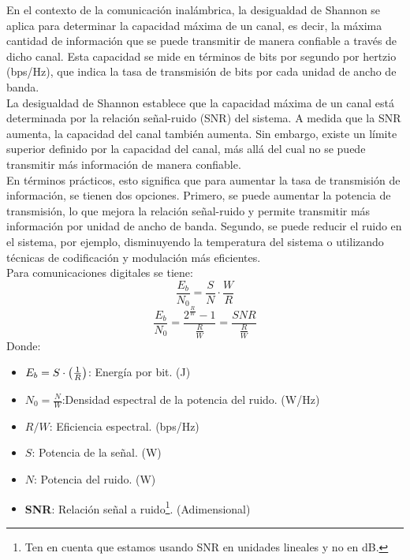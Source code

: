 \documentclass[
	12pt, %
	fleqn, %
	a4paper, %
	oneside, %
]{LegrandOrangeBook}
\begin{document}
En el contexto de la comunicación inalámbrica, la desigualdad de Shannon se aplica para determinar la capacidad máxima de un canal, es decir, la máxima cantidad de información que se puede transmitir de manera confiable a través de dicho canal. Esta capacidad se mide en términos de bits por segundo por hertzio (bps/Hz), que indica la tasa de transmisión de bits por cada unidad de ancho de banda.\\
La desigualdad de Shannon establece que la capacidad máxima de un canal está determinada por la relación señal-ruido (SNR) del sistema. A medida que la SNR aumenta, la capacidad del canal también aumenta. Sin embargo, existe un límite superior definido por la capacidad del canal, más allá del cual no se puede transmitir más información de manera confiable.\\
En términos prácticos, esto significa que para aumentar la tasa de transmisión de información, se tienen dos opciones. Primero, se puede aumentar la potencia de transmisión, lo que mejora la relación señal-ruido y permite transmitir más información por unidad de ancho de banda. Segundo, se puede reducir el ruido en el sistema, por ejemplo, disminuyendo la temperatura del sistema o utilizando técnicas de codificación y modulación más eficientes.\\
Para comunicaciones digitales se tiene:
\begin{equation}
\frac{E_b}{N_0}=\frac{S}{N}\cdot\frac{W}{R}
\end{equation}
\begin{equation}
\frac{E_b}{N_0}=\frac{2^{\frac{R}{W}}-1}{\frac{R}{W}}=\frac{SNR}{\frac{R}{W}}
\end{equation}
Donde:
\begin{itemize}
\item $E_b=S\cdot\left(\frac{1}{R}\right)$: Energía por bit. (J)
\item $N_0=\frac{N}{W}$:Densidad espectral de la potencia del ruido. (W/Hz)
\item $R/W$: Eficiencia espectral. (bps/Hz)
\item $S$: Potencia de la señal. (W)
\item $N$: Potencia del ruido. (W)
\item \textbf{SNR}: Relación señal a ruido\footnote{Ten en cuenta que estamos usando SNR en unidades lineales y no en dB.}. (Adimensional)
\end{itemize}
\end{document}
